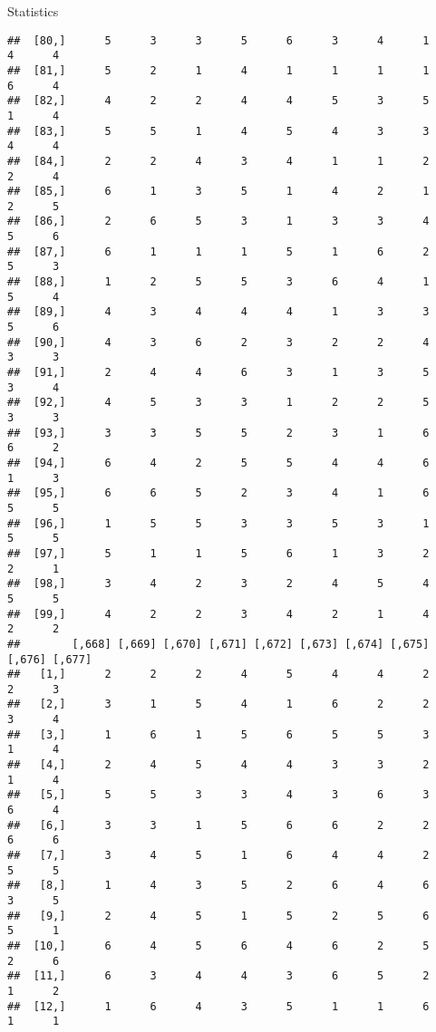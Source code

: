 \documentclass[
  ignorenonframetext,
]{beamer}
\begin{document}
\begin{frame}[fragile]{Statistics}
\begin{verbatim}
##  [80,]      5      3      3      5      6      3      4      1      4      4
##  [81,]      5      2      1      4      1      1      1      1      6      4
##  [82,]      4      2      2      4      4      5      3      5      1      4
##  [83,]      5      5      1      4      5      4      3      3      4      4
##  [84,]      2      2      4      3      4      1      1      2      2      4
##  [85,]      6      1      3      5      1      4      2      1      2      5
##  [86,]      2      6      5      3      1      3      3      4      5      6
##  [87,]      6      1      1      1      5      1      6      2      5      3
##  [88,]      1      2      5      5      3      6      4      1      5      4
##  [89,]      4      3      4      4      4      1      3      3      5      6
##  [90,]      4      3      6      2      3      2      2      4      3      3
##  [91,]      2      4      4      6      3      1      3      5      3      4
##  [92,]      4      5      3      3      1      2      2      5      3      3
##  [93,]      3      3      5      5      2      3      1      6      6      2
##  [94,]      6      4      2      5      5      4      4      6      1      3
##  [95,]      6      6      5      2      3      4      1      6      5      5
##  [96,]      1      5      5      3      3      5      3      1      5      5
##  [97,]      5      1      1      5      6      1      3      2      2      1
##  [98,]      3      4      2      3      2      4      5      4      5      5
##  [99,]      4      2      2      3      4      2      1      4      2      2
##        [,668] [,669] [,670] [,671] [,672] [,673] [,674] [,675] [,676] [,677]
##   [1,]      2      2      2      4      5      4      4      2      2      3
##   [2,]      3      1      5      4      1      6      2      2      3      4
##   [3,]      1      6      1      5      6      5      5      3      1      4
##   [4,]      2      4      5      4      4      3      3      2      1      4
##   [5,]      5      5      3      3      4      3      6      3      6      4
##   [6,]      3      3      1      5      6      6      2      2      6      6
##   [7,]      3      4      5      1      6      4      4      2      5      5
##   [8,]      1      4      3      5      2      6      4      6      3      5
##   [9,]      2      4      5      1      5      2      5      6      5      1
##  [10,]      6      4      5      6      4      6      2      5      2      6
##  [11,]      6      3      4      4      3      6      5      2      1      2
##  [12,]      1      6      4      3      5      1      1      6      1      1

\end{verbatim}
\end{frame}
\end{document}
